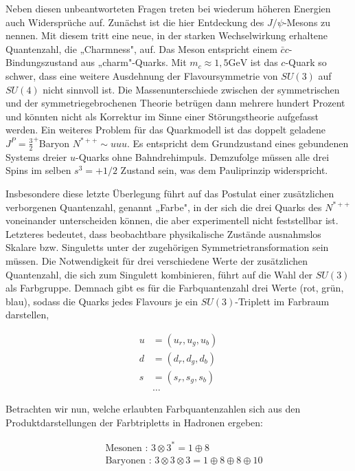 \documentclass[10pt, letterpaper]{article}
\begin{document}
Neben diesen unbeantworteten Fragen treten bei wiederum höheren Energien auch Widersprüche auf. Zunächst ist die hier Entdeckung des $J / \psi$-Mesons zu nennen. Mit diesem tritt eine neue, in der starken Wechselwirkung erhaltene Quantenzahl, die „Charmness", auf. Das Meson entspricht einem $\bar{c} c$-Bindungszustand aus „charm"-Quarks. Mit $m_{c} \approx 1,5 \mathrm{GeV}$ ist das $c$-Quark so schwer, dass eine weitere Ausdehnung der Flavoursymmetrie von $S U(3)$ auf $S U(4)$ nicht sinnvoll ist. Die Massenunterschiede zwischen der symmetrischen und der symmetriegebrochenen Theorie betrügen dann mehrere hundert Prozent und könnten nicht als Korrektur im Sinne einer Störungstheorie aufgefasst werden. Ein weiteres Problem für das Quarkmodell ist das doppelt geladene $J^{P}=\frac{3}{2}^{+}$Baryon $N^{*++} \sim u u u$. Es entspricht dem Grundzustand eines gebundenen Systems dreier $u$-Quarks ohne Bahndrehimpuls. Demzufolge müssen alle drei Spins im selben $s^{3}=+1 / 2$ Zustand sein, was dem Pauliprinzip widerspricht.

Insbesondere diese letzte Überlegung führt auf das Postulat einer zusätzlichen verborgenen Quantenzahl, genannt „Farbe", in der sich die drei Quarks des $N^{*++}$ voneinander unterscheiden können, die aber experimentell nicht feststellbar ist. Letzteres bedeutet, dass beobachtbare physikalische Zustände ausnahmslos Skalare bzw. Singuletts unter der zugehörigen Symmetrietransformation sein müssen. Die Notwendigkeit für drei verschiedene Werte der zusätzlichen Quantenzahl, die sich zum Singulett kombinieren, führt auf die Wahl der $S U(3)$ als Farbgruppe. Demnach gibt es für die Farbquantenzahl drei Werte (rot, grün, blau), sodass die Quarks jedes Flavours je ein $S U(3)$-Triplett im Farbraum darstellen,

$$
\begin{aligned}
u & =\left(u_{r}, u_{g}, u_{b}\right) \\
d & =\left(d_{r}, d_{g}, d_{b}\right) \\
s & =\left(s_{r}, s_{g}, s_{b}\right) \\
& \ldots
\end{aligned}
$$

Betrachten wir nun, welche erlaubten Farbquantenzahlen sich aus den Produktdarstellungen der Farbtripletts in Hadronen ergeben:

$$
\begin{aligned}
& \text { Mesonen : } 3 \otimes 3^{*}=1 \oplus 8 \\
& \text { Baryonen : } 3 \otimes 3 \otimes 3=1 \oplus 8 \oplus 8 \oplus 10
\end{aligned}
$$
\end{document}
